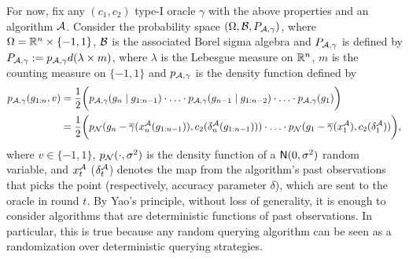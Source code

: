 



For now, fix any $(c_1,c_2)$ type-I oracle $\gamma$ with the above properties and an algorithm $\mathcal{A}$.
Consider the probability space $(\Omega, \mathcal{B}, P_{\mathcal{A},\gamma})$, 
where $\Omega = \mathbb{R}^n\times \{-1,1\}$, $\mathcal{B}$ is the associated Borel sigma algebra
and $P_{\mathcal{A},\gamma}$ is defined by $P_{\mathcal{A},\gamma} := p_{\mathcal{A},\gamma} d(\lambda \times m)$, 
where
	$\lambda$ is the Lebesgue measure on $\mathbb{R}^n$, 
	$m$ is the counting measure on $\{-1,1\}$ and 
	$p_{\mathcal{A},\gamma}$ is the density function defined by
\begin{align*}
p_{\mathcal{A},\gamma}(g_{1:n}, v) 
&= \dfrac{1}{2} \bigg(p_{\mathcal{A},\gamma}(g_n \mid g_{1:n-1})
		\cdot \ldots \cdot p_{\mathcal{A},\gamma }(g_{n-1} \mid g_{1:n-2}) \cdot \ldots \cdot p_{\mathcal{A},\gamma}(g_1)\bigg)\\
&=  \dfrac{1}{2} \bigg( p_{\mathcal{N}}(g_n - \overline{\gamma}(x_n^{\mathcal{A}}(g_{1:n-1})),c_2(\delta_n^{\mathcal{A}}(g_{1:n-1}))) \cdot
									 \ldots \cdot  p_{\mathcal{N}}(g_1 - \overline{\gamma}(x_1^{\mathcal{A}}),c_2(\delta_1^{\mathcal{A}}))\bigg),
\end{align*}
where $v\in\{-1,1\}$, $p_{\mathcal{N}}(\cdot,\sigma^2)$ is the density function of a $\mathsf{N}(0,\sigma^2)$ random variable,
and $x_t^{\mathcal{A}}$ ($\delta_t^{\mathcal{A}}$) denotes the map from the algorithm's past observations
that picks the point (respectively, accuracy parameter $\delta$), which are sent to the oracle in round $t$.
By Yao's principle, without loss of generality, 
it is enough to consider algorithms that are deterministic functions of past observations.
In particular, this is true because any random querying algorithm can be seen as a randomization over deterministic querying strategies. 



